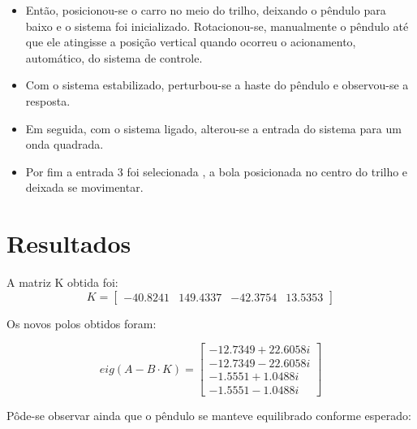 \documentclass[journal]{IEEEtran}
\begin{document}
\begin{itemize}
\item
Então, posicionou-se o carro no meio do trilho, deixando o 
pêndulo para baixo e o sistema foi inicializado. Rotacionou-se, 
manualmente o pêndulo até que ele atingisse a posição vertical quando 
ocorreu o acionamento, automático, do sistema de controle.

\item
Com o sistema estabilizado, perturbou-se a haste do pêndulo e 
observou-se a resposta.

\item
Em seguida, com o sistema ligado, alterou-se a entrada do 
sistema para um onda quadrada.

\item
Por fim a entrada 3 foi selecionada 
, a bola posicionada no centro do trilho e deixada se movimentar.
\end{itemize}

\section{Resultados}

A matriz K obtida foi:
\begin{equation}
 K = \left[
 \begin{array}{llll}
   -40.8241  &149.4337&  -42.3754  & 13.5353
 \end{array}
 \right]
\end{equation}

Os novos polos obtidos foram:

\begin{equation}
eig(A - B\cdot K) = \left[
 \begin{array}{l}
 -12.7349 +22.6058i \\
 -12.7349 -22.6058i \\
  -1.5551 + 1.0488i \\
  -1.5551 - 1.0488i
 \end{array}
 \right]
\end{equation}

Pôde-se observar ainda que o pêndulo se manteve equilibrado conforme 
esperado:
\end{document}
